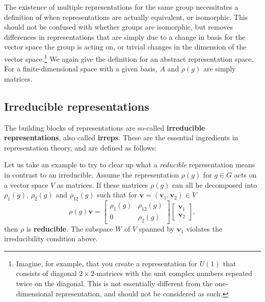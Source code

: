\documentclass[notes.tex]{subfiles}
\begin{document}
The existence of multiple representations for the same group necessitates a definition of when representations are actually equivalent, or isomorphic. This should not be confused with whether groups are isomorphic, but removes differences in representations that are simply due to a change in basis for the vector space the group is acting on, or trivial changes in the dimension of the vector space.\footnote{Imagine, for example, that you create a representation for $U(1)$ that consists of diagonal $2\times2$-matrices with the unit complex numbers repeated twice on the diagonal. This is not essentially different from the one-dimensional representation, and should not be considered as such.} 
We again give the definition for an abstract representation space. For a finite-dimensional space with a given basis, $A$ and $\rho(g)$ are simply matrices.


\subsection{Irreducible representations}
\label{sec:irreps}
The building blocks of representations are so-called {\bf irreducible representations}, also called {\bf irreps}. These are the essential ingredients in representation theory, and are defined as follows: 

Let us take an example to try to clear up what a {\it reducible} representation means in contrast to an irreducible. Assume the representation $\rho(g)$ for $g \in G$ acts on a vector space $V$ as matrices. If these matrices $\rho(g)$ can all be decomposed into $\rho_1(g)$, $\rho_2(g)$ and $\rho_{12}(g)$ such that for $\mathbf v =(\mathbf v_1, \mathbf v_2)\in V$ 
\[\rho(g) \mathbf v = \begin{bmatrix}\rho_1(g) & \rho_{12}(g) \\ 0 & \rho_2(g)\end{bmatrix} \begin{bmatrix}\mathbf v_1 \\ \mathbf v_2 \end{bmatrix}  ,\]
then $\rho$ is {\bf reducible}. The subspace $W$ of $V$ spanned by $\mathbf v_1$ violates the irreducibility condition above.
\end{document}
